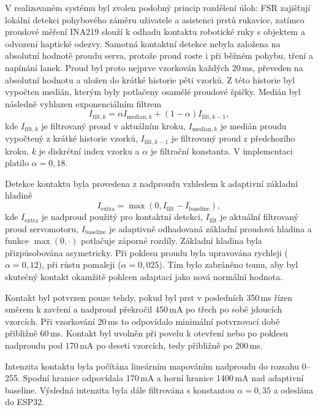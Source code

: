 \documentclass[FZS,DP]{tulthesis}
\begin{document}
V realizovaném systému byl zvolen podobný princip rozdělení úloh: FSR zajišťují lokální detekci pohybového záměru uživatele a asistenci prstů rukavice, zatímco proudové měření INA219 slouží k odhadu kontaktu robotické ruky s objektem a odvození haptické odezvy. Samotná kontaktní detekce nebyla založena na absolutní hodnotě proudu serva, protože proud roste i při běžném pohybu, tření a napínání lanek. Proud byl proto nejprve vzorkován každých 20\,ms, převeden na absolutní hodnotu a uložen do krátké historie pěti vzorků. Z této historie byl vypočten medián, kterým byly potlačeny osamělé proudové špičky. Medián byl následně vyhlazen exponenciálním filtrem
\begin{equation}
    I_{\mathrm{filt},k} =
    \alpha I_{\mathrm{median},k}
    + \left(1 - \alpha\right)I_{\mathrm{filt},k-1},
\end{equation}
kde $I_{\mathrm{filt},k}$ je filtrovaný proud v aktuálním kroku,
$I_{\mathrm{median},k}$ je medián proudu vypočtený z krátké historie vzorků,
$I_{\mathrm{filt},k-1}$ je filtrovaný proud z předchozího kroku,
$k$ je diskrétní index vzorku a $\alpha$ je filtrační konstanta.
V implementaci platilo $\alpha = 0{,}18$.

Detekce kontaktu byla provedena z nadproudu vzhledem k adaptivní základní hladině
\begin{equation}
    I_{\mathrm{extra}} =
    \max\left(0, I_{\mathrm{filt}} - I_{\mathrm{baseline}}\right),
\end{equation}
kde $I_{\mathrm{extra}}$ je nadproud použitý pro kontaktní detekci,
$I_{\mathrm{filt}}$ je aktuální filtrovaný proud servomotoru,
$I_{\mathrm{baseline}}$ je adaptivně odhadovaná základní proudová hladina
a funkce $\max(0,\cdot)$ potlačuje záporné rozdíly.
Základní hladina byla přizpůsobována asymetricky. Při poklesu proudu byla upravována rychleji ($\alpha = 0{,}12$), při růstu pomaleji ($\alpha = 0{,}025$). Tím bylo zabráněno tomu, aby byl skutečný kontakt okamžitě pohlcen adaptací jako nová normální hodnota.

Kontakt byl potvrzen pouze tehdy, pokud byl prst v posledních 350\,ms řízen směrem k zavření a nadproud překročil 450\,mA po třech po sobě jdoucích vzorcích. Při vzorkování 20\,ms to odpovídalo minimální potvrzovací době přibližně 60\,ms. Kontakt byl uvolněn při povelu k otevření nebo po poklesu nadproudu pod 170\,mA po deseti vzorcích, tedy přibližně po 200\,ms.

Intenzita kontaktu byla počítána lineárním mapováním nadproudu do rozsahu 0--255. Spodní hranice odpovídala 170\,mA a horní hranice 1400\,mA nad adaptivní baseline. Výsledná intenzita byla dále filtrována s konstantou $\alpha = 0{,}35$ a odeslána do ESP32.
\end{document}
